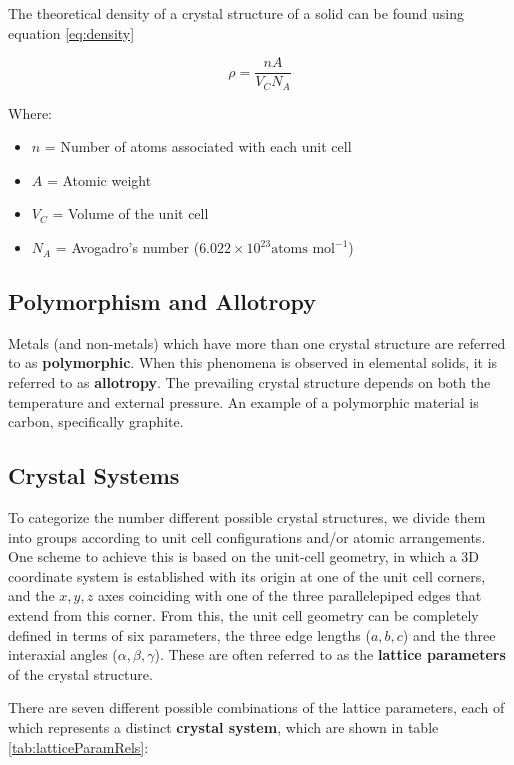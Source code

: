 \documentclass{article}
\begin{document}
The theoretical density of a crystal structure of a solid can be found using equation \ref{eq:density}

\begin{equation}\label{eq:density}
    \rho = \frac{nA}{V_C N_A}
\end{equation}

Where: 
\begin{itemize}
    \item $n$ = Number of atoms associated with each unit cell
    \item $A$ = Atomic weight
    \item $V_C$ = Volume of the unit cell
    \item $N_A$ = Avogadro's number ($6.022 \times 10^{23} \text{atoms mol}^{-1}$)
\end{itemize}

\subsection{Polymorphism and Allotropy}

Metals (and non-metals) which have more than one crystal structure are referred to as \textbf{polymorphic}. When this phenomena is observed in elemental solids, it is referred to as \textbf{allotropy}. The prevailing crystal structure depends on both the temperature and external pressure. An example of a polymorphic material is carbon, specifically graphite.

\subsection{Crystal Systems}

To categorize the number different possible crystal structures, we divide them into groups according to unit cell configurations and/or atomic arrangements. One scheme to achieve this is based on the unit-cell geometry, in which a 3D coordinate system is established with its origin at one of the unit cell corners, and the $x,y,z$ axes coinciding with one of the three parallelepiped edges that extend from this corner. From this, the unit cell geometry can be completely defined in terms of six parameters, the three edge lengths ($a,b,c$) and the three interaxial angles ($\alpha, \beta, \gamma$). These are often referred to as the \textbf{lattice parameters} of the crystal structure.

There are seven different possible combinations of the lattice parameters, each of which represents a distinct \textbf{crystal system}, which are shown in table \ref{tab:latticeParamRels}:
\end{document}
